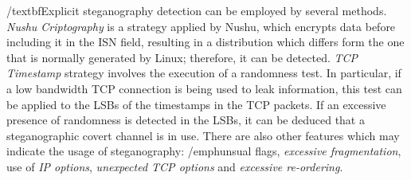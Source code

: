 \documentclass[../../main.tex]{subfiles}
\begin{document}
    /textbf{Explicit steganography detection} can be employed by several methods.
    \emph{Nushu Criptography} is a strategy applied by Nushu, which encrypts data before 
    including it in the ISN field, resulting in a distribution which differs form the one
    that is normally generated by Linux; therefore, it can be detected. 
    \emph{TCP Timestamp} strategy involves the execution of a randomness test. In particular, 
    if a low bandwidth TCP connection is being used to leak information, this test can be applied 
    to the LSBs of the timestamps in the TCP packets. If an excessive presence of randomness 
    is detected in the LSBs, it can be deduced that a steganographic covert channel is in use.
    There are also other features which may indicate the usage of steganography: /emph{unsual 
    flags}, \emph{excessive fragmentation}, use of \emph{IP options}, \emph{unexpected TCP
    options} and \emph{excessive re-ordering}.


    \pagebreak
\end{document}
